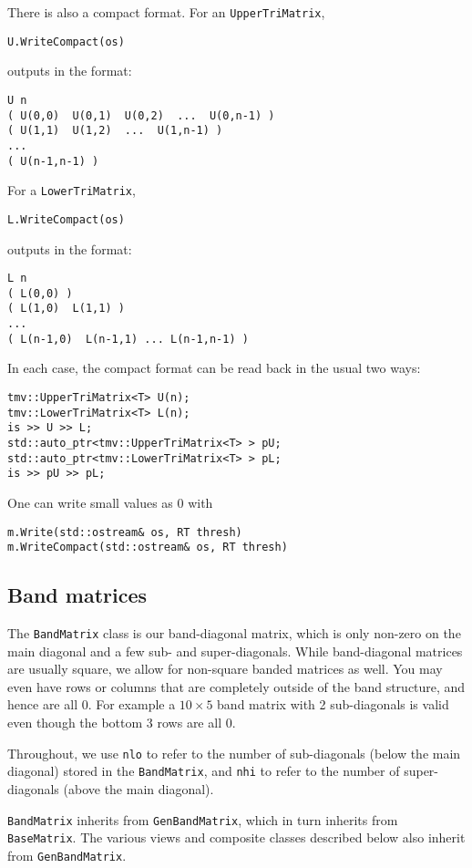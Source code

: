 \documentclass[twoside,letterpaper,11pt]{article}
\renewcommand{\tt}[1]{{\texttt {#1}}}
\begin{document}
There is also a compact format.  For an \tt{UpperTriMatrix},
\begin{verbatim}
U.WriteCompact(os)
\end{verbatim}
outputs in the format:
\begin{verbatim}
U n 
( U(0,0)  U(0,1)  U(0,2)  ...  U(0,n-1) )
( U(1,1)  U(1,2)  ...  U(1,n-1) )
...
( U(n-1,n-1) )
\end{verbatim}
For a \tt{LowerTriMatrix},
\begin{verbatim}
L.WriteCompact(os)
\end{verbatim}
outputs in the format:
\begin{verbatim}
L n 
( L(0,0) )
( L(1,0)  L(1,1) )
...
( L(n-1,0)  L(n-1,1) ... L(n-1,n-1) )
\end{verbatim}

In each case, the compact format can be read back in the usual two ways:
\begin{verbatim}
tmv::UpperTriMatrix<T> U(n);
tmv::LowerTriMatrix<T> L(n);
is >> U >> L;
std::auto_ptr<tmv::UpperTriMatrix<T> > pU;
std::auto_ptr<tmv::LowerTriMatrix<T> > pL;
is >> pU >> pL;
\end{verbatim}

One can write small values as 0 with
\begin{verbatim}
m.Write(std::ostream& os, RT thresh)
m.WriteCompact(std::ostream& os, RT thresh)
\end{verbatim}

\subsection{Band matrices}

The \tt{BandMatrix} class is our band-diagonal matrix, which is only non-zero
on the main diagonal and a few sub- and super-diagonals.  While band-diagonal
matrices are usually square, we allow for non-square banded matrices as well.
You may even have rows or columns that are completely outside of the 
band structure, and hence are all 0.  For example a $10\times 5$ band matrix
with 2 sub-diagonals is valid even though the bottom 3 rows are all 0.

Throughout, we use \tt{nlo} to refer to the number of sub-diagonals 
(below the main diagonal) stored
in the \tt{BandMatrix}, and \tt{nhi} to refer to the number of super-diagonals
(above the main diagonal).

\tt{BandMatrix} inherits from \tt{GenBandMatrix}, which in turn inherits from
\tt{BaseMatrix}.  
The various views and composite classes described below 
also inherit from \tt{GenBandMatrix}.
\end{document}
